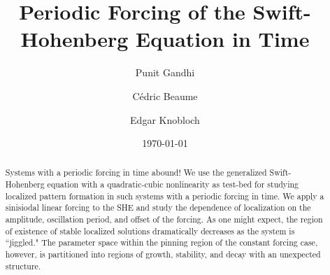 \documentclass[pre,longbibliography,12pt,a4paper,preprint]{revtex4-1}
\begin{document}


\title{Periodic Forcing of the Swift-Hohenberg Equation in Time}
\author{Punit Gandhi}
\author{C\'edric Beaume}
\author{Edgar Knobloch}
\date{\today}

\begin{abstract}
Systems with a periodic forcing in time abound!  We use the generalized Swift-Hohenberg equation with a quadratic-cubic nonlinearity as test-bed for studying localized pattern formation in such systems with a periodic forcing in time.  We apply a sinisiodal linear forcing to the SHE and study the dependence of localization on the amplitude, oscillation period, and offset of the forcing.  As one might expect, the region of existence of stable localized solutions dramatically decreases as the system is ``jiggled."  The parameter space within the pinning region of the constant forcing case, however, is partitioned into regions of growth, stability, and decay with an unexpected structure. 

\end{abstract}

\maketitle





\newpage







\newpage






\end{document}
